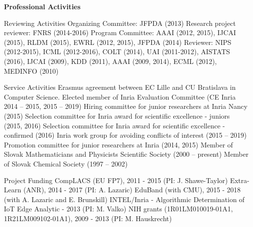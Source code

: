 \documentclass{resume}
\begin{document}
\maketitle


\begin{flushleft} 
\textbf{\sc Professional Activities}
\end{flushleft} 



\begin{category}{Reviewing Activities}
\citembullet Organizing Committee: JFPDA (2013)
\citembullet Research project reviewer: FNRS (2014-2016)
\citembullet Program Committee: AAAI (2012, 2015), IJCAI (2015), RLDM (2015), EWRL 
(2012, 2015), JFPDA (2014)
\citembullet  Reviewer: NIPS (2012-2015), ICML (2012-2016), COLT
(2014), UAI (2011-2012), AISTATS (2016), IJCAI (2009), KDD (2011), AAAI (2009, 2014), ECML
(2012), MEDINFO (2010)
\end{category}
\begin{category}{Service Activities}
\citembullet Erasmus agreement between EC Lille and CU Bratislava in Computer
Science.
\citembullet Elected member of Inria Evaluation Committee (CE Inria 2014 -- 2015, 2015 -- 2019)
\citembullet Hiring committee for junior researchers at Inria Nancy (2015)
\citembullet Selection committee for Inria award for scientific excellence - juniors (2015, 2016)
\citembullet Selection committee for Inria award for scientific excellence - confirmed (2016)
\citembullet Inria work group for avoiding conflicts of interest (2015 -- 2019)
\citembullet Promotion committee for junior researchers at Inria (2014, 2015)
\citembullet Member of Slovak Mathematicians and Physicists Scientific Society 
(2000 -- present)
\citembullet Member of Slovak Chemical Society (1997 -- 2002)
\end{category}



\begin{category}{Project Funding}
\citembullet CompLACS (EU FP7), 2011 - 2015 (PI: J. Shawe-Taylor)
\citembullet Extra-Learn (ANR), 2014 - 2017  (PI: A. Lazaric)
\citembullet EduBand (with CMU), 2015 - 2018  (with A. Lazaric and E. Brunskill)  
\citembullet INTEL/Inria - Algorithmic Determination of IoT Edge Analytic -
2013 (PI: M. Valko)
\citembullet NIH grants (1R01LM010019-01A1, 1R21LM009102-01A1), 2009 - 
2013 (PI: M. Hauskrecht)
\end{category}
\end{document}
